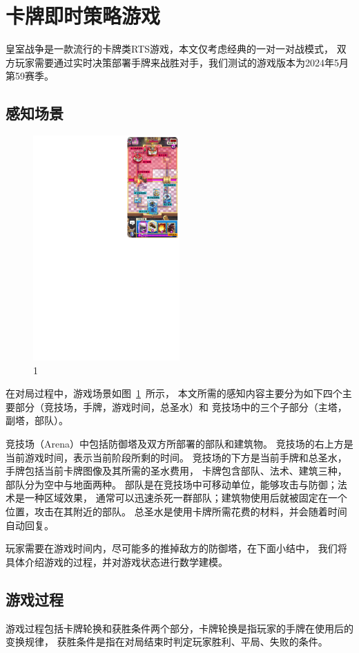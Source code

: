 \documentclass[openany,twoside,nofonts,AutoFakeBold,UTF8]{ctexbook}
\begin{document}
\section{卡牌即时策略游戏}
皇室战争是一款流行的卡牌类RTS游戏，本文仅考虑经典的一对一对战模式，
双方玩家需要通过实时决策部署手牌来战胜对手，我们测试的游戏版本为2024年5月第59赛季。
\subsection{感知场景}
\begin{figure}[htbp]
  \centering
  \includegraphics[width=0.5\textwidth]{figures/introduction.pdf}
  \caption{1}\label{fig-introduction}
\end{figure}
在对局过程中，游戏场景如图~\ref{fig-introduction}~所示，
本文所需的感知内容主要分为如下四个主要部分（竞技场，手牌，游戏时间，总圣水）和
竞技场中的三个子部分（主塔，副塔，部队）。

竞技场（Arena）中包括防御塔及双方所部署的部队和建筑物。
竞技场的右上方是当前游戏时间，表示当前阶段所剩的时间。
竞技场的下方是当前手牌和总圣水，手牌包括当前卡牌图像及其所需的圣水费用，
卡牌包含部队、法术、建筑三种，部队分为空中与地面两种。
部队是在竞技场中可移动单位，能够攻击与防御；法术是一种区域效果，
通常可以迅速杀死一群部队；建筑物使用后就被固定在一个位置，攻击在其附近的部队。
总圣水是使用卡牌所需花费的材料，并会随着时间自动回复。

玩家需要在游戏时间内，尽可能多的推掉敌方的防御塔，在下面小结中，
我们将具体介绍游戏的过程，并对游戏状态进行数学建模。
\subsection{游戏过程}
游戏过程包括卡牌轮换和获胜条件两个部分，卡牌轮换是指玩家的手牌在使用后的变换规律，
获胜条件是指在对局结束时判定玩家胜利、平局、失败的条件。
\end{document}

